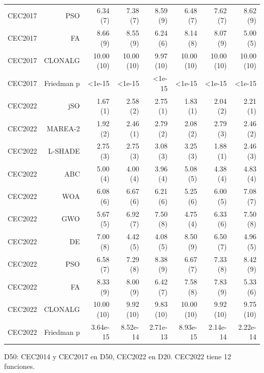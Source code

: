 \begin{table}[ht]
\begin{tabular}{lrrrrrrr}
CEC2017 & PSO & 6.34 (7) & 7.38 (7) & 8.59 (9) & 6.48 (7) & 7.62 (7) & 8.62 (9) \\
CEC2017 & FA & 8.66 (9) & 8.55 (9) & 6.24 (6) & 8.14 (8) & 8.07 (9) & 5.00 (5) \\
CEC2017 & CLONALG & 10.00 (10) & 10.00 (10) & 9.97 (10) & 10.00 (10) & 10.00 (10) & 10.00 (10) \\
CEC2017 & Friedman p & <1e-15 & <1e-15 & <1e-15 & <1e-15 & <1e-15 & <1e-15 \\
CEC2022 & jSO & 1.67 (1) & 2.58 (2) & 2.75 (1) & 1.83 (1) & 2.04 (2) & 2.21 (1) \\
CEC2022 & MAREA-2 & 1.92 (2) & 2.46 (1) & 2.79 (2) & 2.08 (2) & 2.79 (3) & 2.46 (2) \\
CEC2022 & L-SHADE & 2.75 (3) & 2.75 (3) & 3.08 (3) & 3.25 (3) & 1.88 (1) & 2.46 (3) \\
CEC2022 & ABC & 5.00 (4) & 4.00 (4) & 3.96 (4) & 5.08 (5) & 4.38 (4) & 4.83 (4) \\
CEC2022 & WOA & 6.08 (6) & 6.67 (6) & 6.21 (6) & 5.25 (6) & 6.00 (5) & 7.08 (7) \\
CEC2022 & GWO & 5.67 (5) & 6.92 (7) & 7.50 (8) & 4.75 (4) & 6.33 (6) & 7.50 (8) \\
CEC2022 & DE & 7.00 (8) & 4.42 (5) & 4.08 (5) & 8.50 (9) & 6.50 (7) & 4.96 (5) \\
CEC2022 & PSO & 6.58 (7) & 7.29 (8) & 8.38 (9) & 6.67 (7) & 7.33 (8) & 8.42 (9) \\
CEC2022 & FA & 8.33 (9) & 8.00 (9) & 6.42 (7) & 7.58 (8) & 7.83 (9) & 5.33 (6) \\
CEC2022 & CLONALG & 10.00 (10) & 9.92 (10) & 9.83 (10) & 10.00 (10) & 9.92 (10) & 9.75 (10) \\
CEC2022 & Friedman p & 3.64e-15 & 8.52e-14 & 2.71e-13 & 8.93e-15 & 2.14e-14 & 2.22e-14 \\
\bottomrule
\end{tabular}
\par\footnotesize D50: CEC2014 y CEC2017 en D50, CEC2022 en D20. CEC2022 tiene 12 funciones.
\end{table}
